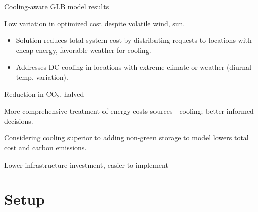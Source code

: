 \documentclass[xcolor=dvipsnames]{beamer}
\newcommand{\carbondioxide}{\ensuremath{\mathrm{CO}_2}}
\begin{document}
\begin{frame}{Cooling-aware GLB model results}

	\begin{block}{Low variation in optimized cost despite volatile wind, sun.}
		\begin{itemize} 
			\item{Solution reduces total system cost by distributing requests to locations with cheap energy, favorable weather for cooling.}
			\item{Addresses DC cooling in locations with extreme climate or weather (diurnal temp. variation).}
		\end{itemize}
	\end{block}
	\vspace{-3mm}
	\begin{block}{Reduction in \carbondioxide{}, halved}
	\end{block}
	\vspace{-3mm}
	\begin{block}{More comprehensive treatment of energy costs sources - cooling; better-informed decisions.}
	\end{block}
	\vspace{-3mm}
	\begin{block}{Considering cooling superior to adding non-green storage to model lowers total cost and carbon emissions.}
	\end{block}
	\vspace{-3mm}
	\begin{block}{Lower infrastructure investment, easier to implement }
	\end{block}
\end{frame}

\section{Setup}
\end{document}
